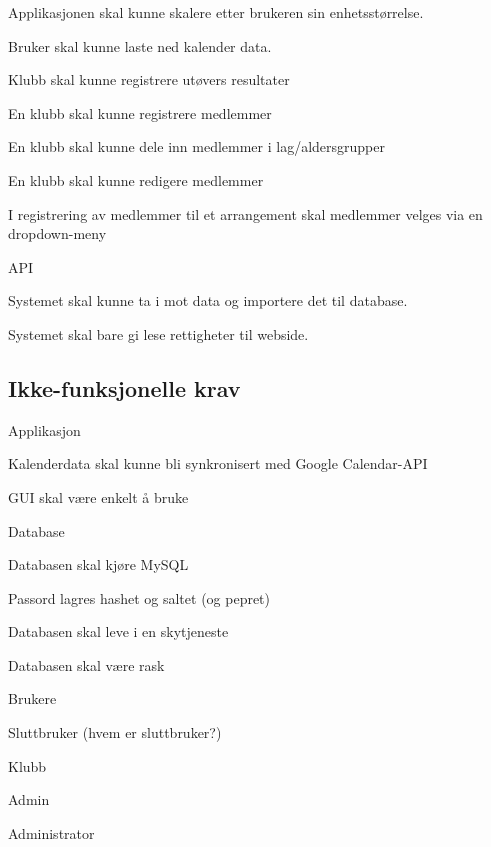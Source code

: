 \documentclass[norsk]{article}
\begin{document}
\begin{legal}
\begin{legal}
        \item Applikasjonen skal kunne skalere etter brukeren sin enhetsstørrelse.
        \item Bruker skal kunne laste ned kalender data.
        \item Klubb skal kunne registrere utøvers resultater
        \item En klubb skal kunne registrere medlemmer
        \begin{legal}
            \item En klubb skal kunne dele inn medlemmer i lag/aldersgrupper
            \item En klubb skal kunne redigere medlemmer
        \end{legal}
        \item I registrering av medlemmer til et arrangement skal medlemmer velges via en dropdown-meny
    \end{legal}
    \item API
    \begin{legal}
        \item Systemet skal kunne ta i mot data og importere det til database.
        \item Systemet skal bare gi lese rettigheter til webside.
    \end{legal}
    
    \subsection{Ikke-funksjonelle krav}
    \item Applikasjon
    \begin{legal}
        \item Kalenderdata skal kunne bli synkronisert med Google Calendar-API
        \item GUI skal være enkelt å bruke
    \end{legal}
    \item Database
    \begin{legal}
        \item Databasen skal kjøre MySQL
        \item Passord lagres hashet og saltet (og pepret)
        \item Databasen skal leve i en skytjeneste
        \item Databasen skal være rask
        
    \end{legal}
    \item Brukere
    \begin{legal}
        \item Sluttbruker (hvem er sluttbruker?)
        \item Klubb
        \item Admin
    \end{legal}
    
    \item Administrator
\end{legal}
\end{document}
